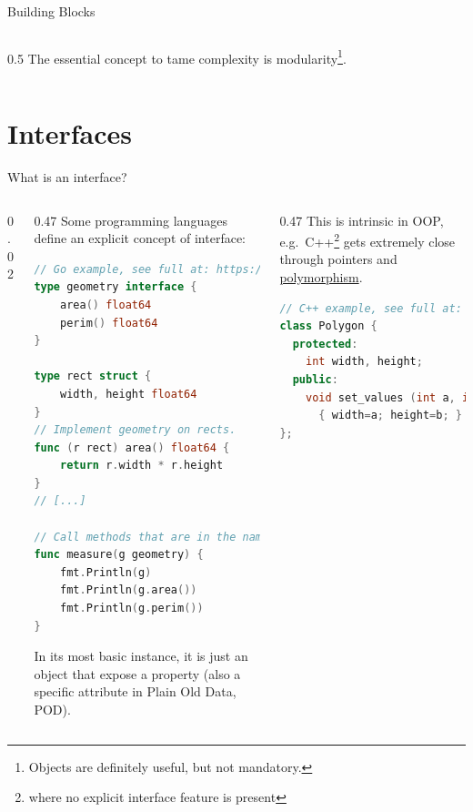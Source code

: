 \documentclass[9pt]{beamer}
\begin{document}
\begin{frame}{Building Blocks}
\begin{columns}
\begin{column}{0.5\textwidth}
            The essential concept to tame complexity is modularity\footnote{
                Objects are definitely useful, but not mandatory.
            }.
        \end{column}
    \end{columns}
\end{frame}

\section{Interfaces}

\begin{frame}[fragile]{What is an interface?}
    \vspace*{30pt}
    \begin{columns}
        \begin{column}{0.02\textwidth}
        \end{column}
        \begin{column}{0.47\textwidth}
            Some programming languages define an explicit concept of interface:

            \begin{lstlisting}[language=Go,style=mystyle]
// Go example, see full at: https://gobyexample.com/interfaces
type geometry interface {
    area() float64
    perim() float64
}

type rect struct {
    width, height float64
}
// Implement geometry on rects.
func (r rect) area() float64 {
    return r.width * r.height
}
// [...]

// Call methods that are in the named interface.
func measure(g geometry) {
    fmt.Println(g)
    fmt.Println(g.area())
    fmt.Println(g.perim())
}\end{lstlisting}

            In its most basic instance, it is just an object that expose a
            property (also a specific attribute in Plain Old Data, POD).
        \end{column}
        \begin{column}{0.47\textwidth}
            This is intrinsic in OOP, e.g.\ C++\footnote{
                where no explicit interface feature is present
            } gets extremely close through pointers and
            \href{https://en.wikipedia.org/wiki/Polymorphism_(computer_science)}{polymorphism}.

            \begin{lstlisting}[language=C++,style=mystyle]
// C++ example, see full at: https://cplusplus.com/doc/tutorial/polymorphism/
class Polygon {
  protected:
    int width, height;
  public:
    void set_values (int a, int b)
      { width=a; height=b; }
};


\end{lstlisting}
\end{column}
\end{columns}
\end{frame}
\end{document}
